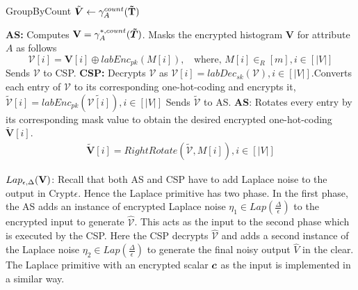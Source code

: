 \begin{algorithm}[t]
\small{
\caption{\textsf{GroupByCount }$\tilde{\boldsymbol{V}} \leftarrow \gamma^{count}_A(\mathbf{\tilde{T}})$}
\begin{algorithmic}[1]
\STATEx \textbf{\textsf{AS}:} \STATE Computes $\mathbf{V}=\gamma^{*,count}_{A}(\boldsymbol{\tilde{T}})$.
\STATE Masks the encrypted histogram $\mathbf{V}$ for attribute $A$ as follows 
$$\boldsymbol{\mathcal{V}}[i]= \mathbf{V}[i] \oplus labEnc_{pk}(M[i]), ~~~~\text{where, }M[i] \in_R [m], i \in [|V|]$$
\STATE Sends $\boldsymbol{\mathcal{V}}$ to \textsf{CSP}.
\STATEx \textbf{\textsf{CSP}:}
\STATE Decrypts  $\boldsymbol{\mathcal{V}}$ as $\mathcal{V}[i]=labDec_{sk}(\boldsymbol{\mathcal{V}}), i \in [|V|]$.\STATE Converts each entry of $\mathcal{V}$ to its corresponding one-hot-coding and encrypts it, $\boldsymbol{\tilde{\mathcal{V}}}[i]=labEnc_{pk}(\tilde{\mathcal{V}[i]}), i \in [|V|]$
\STATE Sends $\boldsymbol{\tilde{\mathcal{V}}}$ to \textsf{AS}.
\STATEx \textbf{\textsf{AS}}:
\STATE  Rotates every entry by its corresponding mask value to obtain the desired  encrypted one-hot-coding $\boldsymbol{\tilde{V}}[i]$. \begin{gather*}\boldsymbol{\tilde{V}}[i]=RightRotate(\boldsymbol{\tilde{\mathcal{V}}},M[i]), i \in [|V|]\end{gather*} 
 \end{algorithmic} \label{groupby-imp}}
\end{algorithm} 


$Lap_{\epsilon,\Delta}(\mathbf{V})$:  Recall that both \textsf{AS} and \textsf{CSP} have to add Laplace noise to the output in Crypt$\epsilon$. Hence the \textsf{Laplace} primitive  has two phase. In the first phase,  the \textsf{AS} adds an instance of encrypted Laplace noise $\eta_1 \in Lap(\frac{\Delta}{\epsilon})$ to the encrypted input  to generate $\mathbf{\hat{\mathcal{V}}}$. This acts as the input to the second phase which is executed by the \textsf{CSP}. Here the \textsf{CSP} decrypts $\mathbf{\hat{\mathcal{V}}}$ and adds a second instance of the Laplace noise $\eta_2 \in Lap(\frac{\Delta}{\epsilon})$ to generate the final noisy output $\hat{V}$ in the clear. %
The \textsf{Laplace} primitive with an encrypted scalar $\boldsymbol{c}$ as the input is implemented in a similar way.



